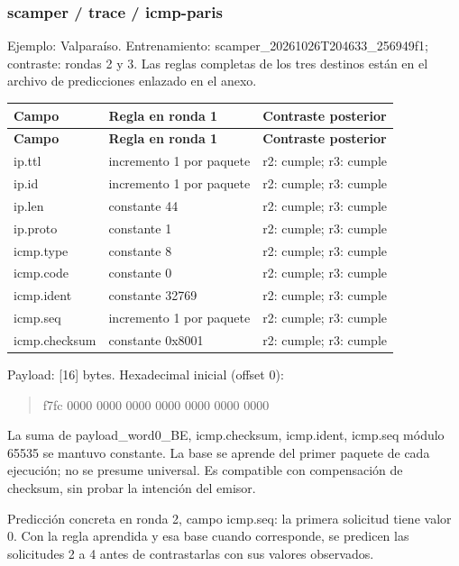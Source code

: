 \subsubsection{scamper / trace / icmp-paris}
Ejemplo: Valparaíso. Entrenamiento: scamper\_\allowbreak{}20261026T204633\_\allowbreak{}256949f1; contraste: rondas 2 y 3. Las reglas completas de los tres destinos están en el archivo de predicciones enlazado en el anexo.

\begingroup
\fontsize{9}{11}\selectfont
\addtocounter{table}{-1}
\begin{longtable}{p{3.1cm}p{5.8cm}p{5.1cm}}
\toprule
\textbf{Campo} & \textbf{Regla en ronda 1} & \textbf{Contraste posterior} \\ \midrule
\endfirsthead
\toprule
\textbf{Campo} & \textbf{Regla en ronda 1} & \textbf{Contraste posterior} \\ \midrule
\endhead
ip.ttl & incremento 1 por paquete & r2: cumple; r3: cumple \\
ip.id & incremento 1 por paquete & r2: cumple; r3: cumple \\
ip.len & constante 44 & r2: cumple; r3: cumple \\
ip.proto & constante 1 & r2: cumple; r3: cumple \\
icmp.type & constante 8 & r2: cumple; r3: cumple \\
icmp.code & constante 0 & r2: cumple; r3: cumple \\
icmp.ident & constante 32769 & r2: cumple; r3: cumple \\
icmp.seq & incremento 1 por paquete & r2: cumple; r3: cumple \\
icmp.checksum & constante 0x8001 & r2: cumple; r3: cumple \\
\bottomrule
\end{longtable}
\endgroup
Payload: [16] bytes. Hexadecimal inicial (offset 0):

\begin{quote}\ttfamily\footnotesize\raggedright f7fc 0000 0000 0000 0000 0000 0000 0000\end{quote}
La suma de payload\_\allowbreak{}word0\_\allowbreak{}BE, icmp.checksum, icmp.ident, icmp.seq módulo 65535 se mantuvo constante. La base se aprende del primer paquete de cada ejecución; no se presume universal. Es compatible con compensación de checksum, sin probar la intención del emisor.

Predicción concreta en ronda 2, campo icmp.seq: la primera solicitud tiene valor 0. Con la regla aprendida y esa base cuando corresponde, se predicen las solicitudes 2 a 4 antes de contrastarlas con sus valores observados.

